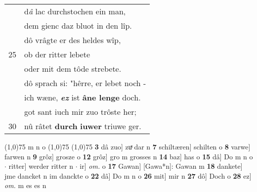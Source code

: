 \documentclass[8pt,a4paper,notitlepage]{article}
\begin{document}
\begin{table}[ht]
\begin{minipage}[t]{0.5\linewidth}
\begin{tabular}{rl}
 & d\textit{â} lac durchstochen ein man,\\ 
 & dem gienc daz bluot in den lîp.\\ 
 & dô vrâgte er des heldes wîp,\\ 
25 & ob der ritter lebete\\ 
 & oder mit dem tôde strebete.\\ 
 & dô sprach si: "hêrre, er lebet noch -\\ 
 & ich wæne, \textit{\textbf{ez}} ist \textbf{âne lenge} doch.\\ 
 & got sant iuch mir zuo trôste her;\\ 
30 & nû râtet \textbf{durch} \textbf{iuwer} triuwe ger.\\ 
\end{tabular}
\scriptsize
\line(1,0){75} \newline
m n o \newline
\line(1,0){75} \newline
\newline
\line(1,0){75} \newline
\textbf{3} dâ zuo] zuͯ dar n \textbf{7} schiltæren] schilten o \textbf{8} varwe] farwen n \textbf{9} grôz] grosze o \textbf{12} grôz] gro m grosses n \textbf{14} baz] has o \textbf{15} dâ] Do m n o  $\cdot$ ritter] werder ritter n  $\cdot$ ir] \textit{om.} o \textbf{17} Gawan] [Gawa*n]: Gawan m \textbf{18} dankete] jme dancket n im danckte o \textbf{22} dâ] Do m n o \textbf{26} mit] mir n \textbf{27} dô] Doch o \textbf{28} ez] \textit{om.} m es es n \newline
\end{minipage}
\end{table}
\newpage
\end{document}
